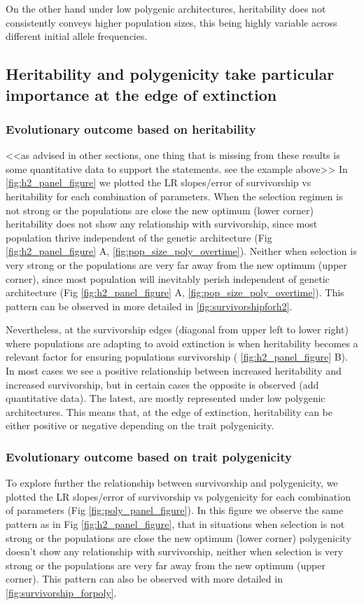 \documentclass{article}
\begin{document}
On the other hand under low polygenic architectures, heritability does not consistently conveys higher population sizes, this being highly variable across different initial allele frequencies. 

\subsection{Heritability and polygenicity take particular importance at the edge of extinction}
\subsubsection{Evolutionary outcome based on heritability}

<<as advised in other sections, one thing that is missing from these results is some quantitative data to support the statements. see the example above>>
In \ref{fig:h2_panel_figure} we plotted the LR slopes/error of survivorship vs heritability for each combination of parameters. When the selection regimen is not strong or the populations are close the new optimum (lower corner) heritability does not show any relationship with survivorship, since most population thrive independent of the genetic architecture (Fig \ref{fig:h2_panel_figure} A, \ref{fig:pop_size_poly_overtime}). Neither when selection is very strong or the populations are very far away from the new optimum (upper corner), since most population will inevitably perish independent of genetic architecture (Fig \ref{fig:h2_panel_figure} A, \ref{fig:pop_size_poly_overtime}). This pattern can be observed in more detailed in \ref{fig:survivorshipforh2}. 

Nevertheless, at the survivorship edges (diagonal from upper left to lower right) where populations are adapting to avoid extinction is when heritability becomes a relevant factor for ensuring populations survivorship ( \ref{fig:h2_panel_figure} B). In most cases we see a positive relationship between increased heritability and increased survivorship, but in certain cases the opposite is observed (add quantitative data). The latest, are mostly represented under low polygenic architectures. This means that, at the edge of extinction, heritability can be either positive or negative depending on the trait polygenicity. 
\\
\subsubsection{Evolutionary outcome based on trait polygenicity}
To explore further the relationship between survivorship and polygenicity, we plotted the LR slopes/error of survivorship vs polygenicity for each combination of parameters (Fig \ref{fig:poly_panel_figure}).  In this figure we observe the same pattern as in Fig \ref{fig:h2_panel_figure}, that in situations when selection is not  strong or the populations are close the new optimum (lower corner) polygenicity doesn't show any relationship with survivorship, neither when selection is very strong or the populations are very far away from the new optimum (upper corner). This pattern can also be observed with more detailed in \ref{fig:survivorship_forpoly}. 
\end{document}
